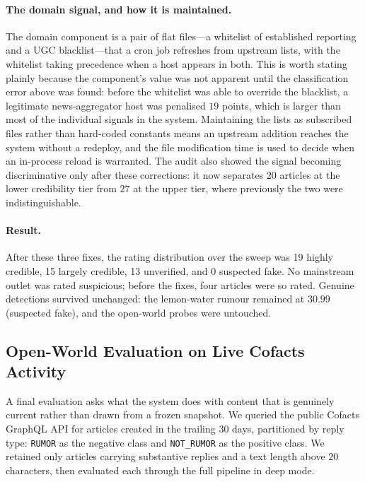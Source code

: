 \documentclass[twoside]{llncs}
\begin{document}
\paragraph{The domain signal, and how it is maintained.}
The domain component is a pair of flat files---a whitelist of established reporting and a UGC blacklist---that a cron job refreshes from upstream lists, with the whitelist taking precedence when a host appears in both. This is worth stating plainly because the component's value was not apparent until the classification error above was found: before the whitelist was able to override the blacklist, a legitimate news-aggregator host was penalised $19$ points, which is larger than most of the individual signals in the system. Maintaining the lists as subscribed files rather than hard-coded constants means an upstream addition reaches the system without a redeploy, and the file modification time is used to decide when an in-process reload is warranted. The audit also showed the signal becoming discriminative only after these corrections: it now separates $20$ articles at the lower credibility tier from $27$ at the upper tier, where previously the two were indistinguishable.

\paragraph{Result.}
After these three fixes, the rating distribution over the sweep was 19 highly credible, 15 largely credible, 13 unverified, and 0 suspected fake. No mainstream outlet was rated suspicious; before the fixes, four articles were so rated. Genuine detections survived unchanged: the lemon-water rumour remained at $30.99$ (suspected fake), and the open-world probes were untouched.

\subsection{Open-World Evaluation on Live Cofacts Activity}
\label{sec:openworld}
A final evaluation asks what the system does with content that is genuinely current rather than drawn from a frozen snapshot. We queried the public Cofacts GraphQL API for articles created in the trailing $30$ days, partitioned by reply type: \texttt{RUMOR} as the negative class and \texttt{NOT\_RUMOR} as the positive class. We retained only articles carrying substantive replies and a text length above $20$ characters, then evaluated each through the full pipeline in deep mode.
\end{document}

